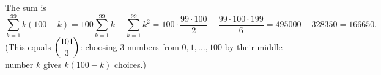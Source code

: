 The sum is
\[\sum_{k=1}^{99}k(100-k)=100\sum_{k=1}^{99}k-\sum_{k=1}^{99}k^2=100\cdot\dfrac{99\cdot100}{2}-\dfrac{99\cdot100\cdot199}{6}=495000-328350=\boxed{166650}.\]
(This equals $\dbinom{101}{3}$: choosing $3$ numbers from $0,1,\dots,100$ by their middle number $k$ gives $k(100-k)$ choices.)
